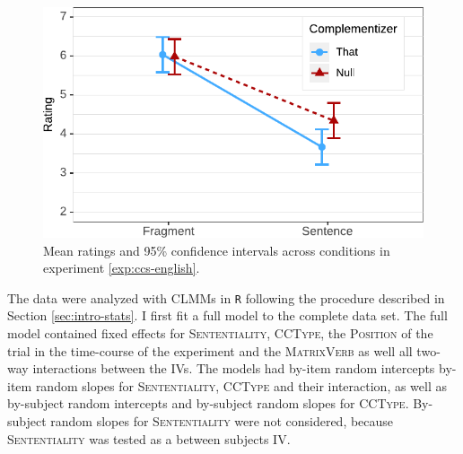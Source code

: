 \begin{figure}
\includegraphics[scale=1]{figures/ex2b_ccs_en_estimates}
 \caption{Mean ratings and 95\% confidence intervals across conditions in experiment \ref{exp:ccs-english}. \label{fig:ccs-english-estimates}}
\end{figure}

The data were analyzed with CLMMs in \texttt{R} following the procedure described in Section \ref{sec:intro-stats}. I first fit a full model to the complete data set. The full model contained fixed effects for \textsc{Sententiality}, \textsc{CCType}, the \textsc{Position} of the trial in the time-course of the experiment and the \textsc{MatrixVerb} as well all two-way interactions between the IVs. The models had by-item random intercepts by-item random slopes for \textsc{Sententiality}, \textsc{CCType} and their interaction, as well as by-subject random intercepts and by-subject random slopes for \textsc{CCType}. By-subject random slopes for \textsc{Sententiality} were not considered, because \textsc{Sententiality} was tested as a between subjects IV. 

